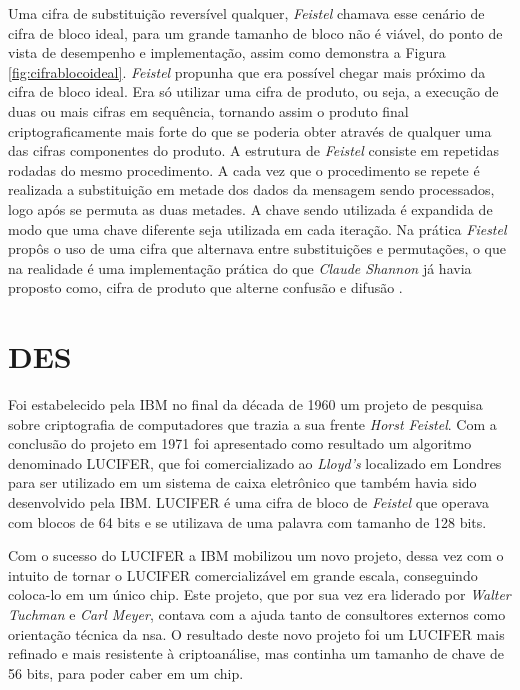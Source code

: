 Uma cifra de substituição reversível qualquer, \textit{Feistel} chamava esse cenário de cifra de bloco ideal, para um grande tamanho de bloco não é viável, do ponto de vista de desempenho e implementação, assim como demonstra a Figura \ref{fig:cifrablocoideal}. \textit{Feistel} propunha que era possível chegar mais próximo da cifra de bloco ideal. Era só utilizar uma cifra de produto, ou seja, a execução de duas ou mais cifras em sequência, tornando assim o produto final criptograficamente mais forte do que se poderia obter através de qualquer uma das cifras componentes do produto. A estrutura de \textit{Feistel} consiste em repetidas rodadas do mesmo procedimento. A cada vez que o procedimento se repete é realizada a substituição em metade dos dados da mensagem sendo processados, logo após se permuta as duas metades. A chave sendo utilizada é expandida de modo que uma chave diferente seja utilizada em cada iteração. Na prática \textit{Fiestel} propôs o uso de uma cifra que alternava entre substituições e permutações, o que na realidade é uma implementação prática do que \textit{Claude Shannon} já havia proposto como, cifra de produto que alterne confusão e difusão \cite{stallings14} \cite{tanenbaum03}.

\section{DES}
\label{sec:des}
Foi estabelecido pela IBM no final da década de 1960 um projeto de pesquisa sobre criptografia de computadores que trazia a sua frente \textit{Horst Feistel}. Com a conclusão do projeto em 1971 foi apresentado como resultado um algoritmo denominado LUCIFER, que foi comercializado ao \textit{Lloyd’s} localizado em Londres para ser utilizado em um sistema de caixa eletrônico que também havia sido desenvolvido pela IBM. LUCIFER é uma cifra de bloco de \textit{Feistel} que operava com blocos de 64 bits e se utilizava de uma palavra com tamanho de 128 bits.

Com o sucesso do LUCIFER a IBM mobilizou um novo projeto, dessa vez com o intuito de tornar o LUCIFER comercializável em grande escala, conseguindo coloca-lo em um único chip. Este projeto, que por sua vez era liderado por \textit{Walter Tuchman} e \textit{Carl Meyer}, contava com a ajuda tanto de consultores externos como orientação técnica da \acrfull{nsa}. O resultado deste novo projeto foi um LUCIFER mais refinado e mais resistente à criptoanálise, mas continha um tamanho de chave de 56 bits, para poder caber em um chip.


